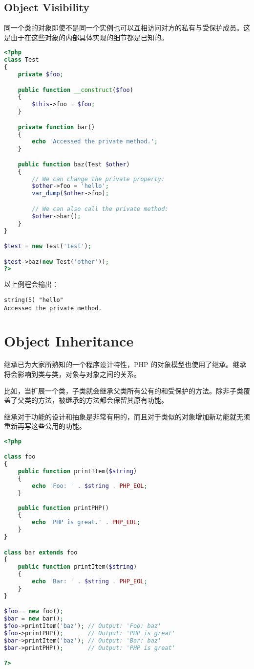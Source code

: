 \section{Object Visibility}

同一个类的对象即使不是同一个实例也可以互相访问对方的私有与受保护成员。这是由于在这些对象的内部具体实现的细节都是已知的。

\begin{lstlisting}[language=PHP]
<?php
class Test
{
    private $foo;

    public function __construct($foo)
    {
        $this->foo = $foo;
    }

    private function bar()
    {
        echo 'Accessed the private method.';
    }

    public function baz(Test $other)
    {
        // We can change the private property:
        $other->foo = 'hello';
        var_dump($other->foo);

        // We can also call the private method:
        $other->bar();
    }
}

$test = new Test('test');

$test->baz(new Test('other'));
?>
\end{lstlisting}

以上例程会输出：

\begin{verbatim}
string(5) "hello"
Accessed the private method.
\end{verbatim}


\chapter{Object Inheritance}

继承已为大家所熟知的一个程序设计特性，PHP 的对象模型也使用了继承。继承将会影响到类与类，对象与对象之间的关系。

比如，当扩展一个类，子类就会继承父类所有公有的和受保护的方法。除非子类覆盖了父类的方法，被继承的方法都会保留其原有功能。

继承对于功能的设计和抽象是非常有用的，而且对于类似的对象增加新功能就无须重新再写这些公用的功能。




\begin{lstlisting}[language=PHP]
<?php

class foo
{
    public function printItem($string) 
    {
        echo 'Foo: ' . $string . PHP_EOL;
    }
    
    public function printPHP()
    {
        echo 'PHP is great.' . PHP_EOL;
    }
}

class bar extends foo
{
    public function printItem($string)
    {
        echo 'Bar: ' . $string . PHP_EOL;
    }
}

$foo = new foo();
$bar = new bar();
$foo->printItem('baz'); // Output: 'Foo: baz'
$foo->printPHP();       // Output: 'PHP is great' 
$bar->printItem('baz'); // Output: 'Bar: baz'
$bar->printPHP();       // Output: 'PHP is great'

?>
\end{lstlisting}


